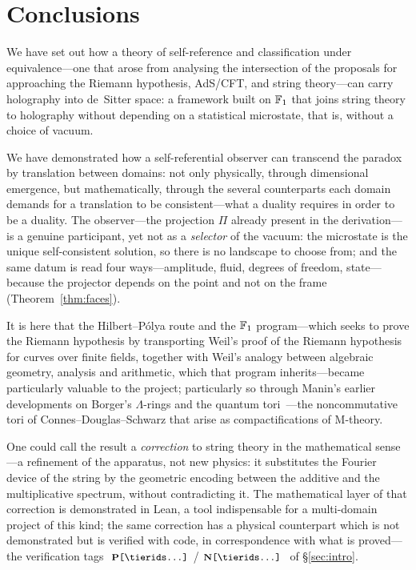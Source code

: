 \section{Conclusions}\label{sec:conclusions}
We have set out how a theory of self-reference and classification under equivalence---one that
arose from analysing the intersection of the proposals for approaching the Riemann hypothesis,
AdS/CFT, and string theory---can carry holography into de~Sitter space: a framework built on
$\mathbb{F}_1$ that joins string theory to holography without depending on a statistical microstate,
that is, without a choice of vacuum.

We have demonstrated how a self-referential observer can transcend the paradox by translation
between domains: not only physically, through dimensional emergence, but mathematically,
through the several counterparts each domain demands for a translation to be consistent---what
a duality requires in order to be a duality. The observer---the projection $\Pi$ already
present in the derivation---is a genuine participant, yet not as a \emph{selector} of the
vacuum: the microstate is the unique self-consistent solution, so there is no landscape to
choose from; and the same datum is read four ways---amplitude, fluid, degrees of freedom,
state---because the projector depends on the point and not on the frame
(Theorem~\ref{thm:faces}).

It is here that the Hilbert--P\'olya route and the $\mathbb{F}_1$ program---which seeks to prove the
Riemann hypothesis by transporting Weil's proof of the Riemann hypothesis for curves over
finite fields, together with Weil's analogy between algebraic geometry, analysis and
arithmetic, which that program inherits---became particularly valuable to the project;
particularly so through Manin's earlier developments on Borger's $\Lambda$-rings and the
quantum tori~\cite{manin04}---the noncommutative tori of Connes--Douglas--Schwarz that arise as
compactifications of M-theory.

One could call the result a \emph{correction} to string theory in the mathematical sense---a
refinement of the apparatus, not new physics: it substitutes the Fourier device of the string
by the geometric encoding between the additive and the multiplicative spectrum, without
contradicting it. The mathematical layer of that correction is demonstrated in Lean, a tool
indispensable for a multi-domain project of this kind; the same correction has a physical
counterpart which is not demonstrated but is verified with code, in correspondence with what
is proved---the verification tags $\witness[...]{P}$/$\witness[...]{N}$ of \S\ref{sec:intro}.

